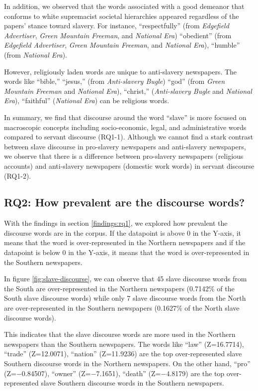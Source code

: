 \documentclass[11pt]{article}
\begin{document}
In addition, we observed that the words associated with a good demeanor that conforms to white supremacist societal hierarchies appeared regardless of the papers' stance toward slavery.
For instance, ``respectfully'' (from \textit{Edgefield Advertiser}, \textit{Green Mountain Freeman}, and \textit{National Era}) ``obedient'' (from \textit{Edgefield Advertiser}, \textit{Green Mountain Freeman}, and \textit{National Era}), ``humble'' (from \textit{National Era}).

However, religiously laden words are unique to anti-slavery newspapers. The words like ``bible,'' ``jesus,'' (from \textit{Anti-slavery Bugle}) ``god'' (from \textit{Green Mountain Freeman} and \textit{National Era}), ``christ,'' (\textit{Anti-slavery Bugle} and \textit{National Era}), ``faithful'' (\textit{National Era}) can be religious words.

In summary, we find that discourse around the word ``slave'' is more focused on macroscopic concepts including socio-economic, legal, and administrative words compared to servant discourse (RQ1-1). 
Although we cannot find a stark contrast between slave discourse in pro-slavery newspapers and anti-slavery newspapers, we observe that there is a difference between pro-slavery newspapers (religious accounts) and anti-slavery newspapers (domestic work words) in servant discourse (RQ1-2).

\subsection{RQ2: How prevalent are the discourse words?} \label{findings:rq2}
With the findings in section \ref{findings:rq1}, we explored how prevalent the discourse words are in the corpus. 
If the datapoint is above 0 in the Y-axis, it means that the word is over-represented in the Northern newspapers and if the datapoint is below 0 in the Y-axis, it means that the word is over-represented in the Southern newspapers. 

In figure \ref{fig:slave-discourse}, we can observe that 45 slave discourse words from the South are over-represented in the Northern newspapers (0.7142\% of the South slave discourse words) while only 7 slave discourse words from the North are over-represented in the Southern newspapers (0.1627\% of the North slave discourse words). 

This indicates that the slave discourse words are more used in the Northern newspapers than the Southern newspapers. The words like ``law'' (Z=16.7714), ``trade'' (Z=12.0071), ``nation'' (Z=11.9236) are the top over-represented slave Southern discourse words in the Northern newspapers. 
On the other hand, ``pro'' (Z=$-$0.84507), ``owner'' (Z=$-$7.1651), ``death'' (Z=$-$4.8179) are the top over-represented slave Southern discourse words in the Southern newspapers. 
\end{document}
